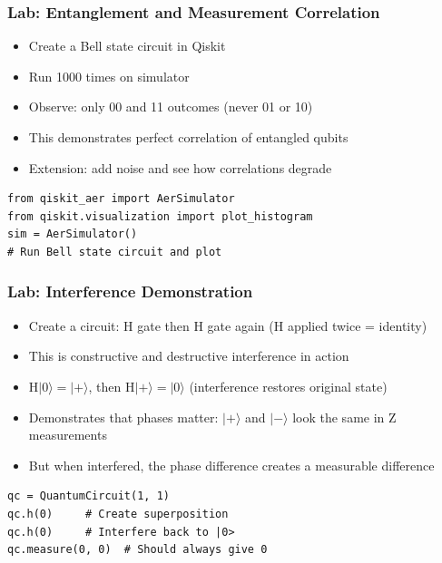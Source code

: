 \begin{frame}[fragile]\frametitle{Lab: Entanglement and Measurement Correlation}
\begin{itemize}
\item Create a Bell state circuit in Qiskit
\item Run 1000 times on simulator
\item Observe: only 00 and 11 outcomes (never 01 or 10)
\item This demonstrates perfect correlation of entangled qubits
\item Extension: add noise and see how correlations degrade
\end{itemize}
\begin{verbatim}
from qiskit_aer import AerSimulator
from qiskit.visualization import plot_histogram
sim = AerSimulator()
# Run Bell state circuit and plot
\end{verbatim}
\end{frame}

\begin{frame}[fragile]\frametitle{Lab: Interference Demonstration}
\begin{itemize}
\item Create a circuit: H gate then H gate again (H applied twice = identity)
\item This is constructive and destructive interference in action
\item H$|0\rangle = |+\rangle$, then H$|+\rangle = |0\rangle$ (interference restores original state)
\item Demonstrates that phases matter: $|+\rangle$ and $|-\rangle$ look the same in Z measurements
\item But when interfered, the phase difference creates a measurable difference
\end{itemize}
\begin{verbatim}
qc = QuantumCircuit(1, 1)
qc.h(0)     # Create superposition
qc.h(0)     # Interfere back to |0>
qc.measure(0, 0)  # Should always give 0
\end{verbatim}
\end{frame}

